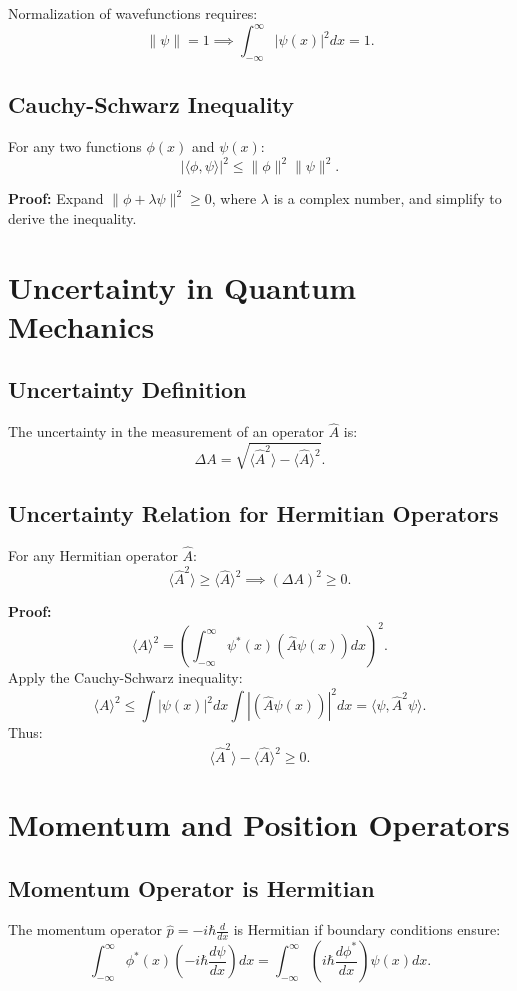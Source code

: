 \documentclass[a4paper,12pt]{article}
\begin{document}
\begin{multicols}{2}
Normalization of wavefunctions requires:
\[
\|\psi\| = 1 \implies \int_{-\infty}^\infty |\psi(x)|^2 dx = 1.
\]

\subsection*{Cauchy-Schwarz Inequality}
For any two functions $\phi(x)$ and $\psi(x)$:
\[
|\langle \phi, \psi \rangle|^2 \leq \|\phi\|^2 \|\psi\|^2.
\]

\textbf{Proof:}
Expand $\|\phi + \lambda \psi\|^2 \geq 0$, where $\lambda$ is a complex number, and simplify to derive the inequality.

\section*{Uncertainty in Quantum Mechanics}

\subsection*{Uncertainty Definition}
The uncertainty in the measurement of an operator $\hat{A}$ is:
\[
\Delta A = \sqrt{\langle \hat{A}^2 \rangle - \langle \hat{A} \rangle^2}.
\]

\subsection*{Uncertainty Relation for Hermitian Operators}
For any Hermitian operator $\hat{A}$:
\[
\langle \hat{A}^2 \rangle \geq \langle \hat{A} \rangle^2 \implies (\Delta A)^2 \geq 0.
\]

\textbf{Proof:}
\[
\langle A \rangle^2 = \left( \int_{-\infty}^\infty \psi^*(x) (\hat{A} \psi(x)) dx \right)^2.
\]
Apply the Cauchy-Schwarz inequality:
\[
\langle A \rangle^2 \leq \int |\psi(x)|^2 dx \int |(\hat{A} \psi(x))|^2 dx = \langle \psi, \hat{A}^2 \psi \rangle.
\]
Thus:
\[
\langle \hat{A}^2 \rangle - \langle \hat{A} \rangle^2 \geq 0.
\]

\section*{Momentum and Position Operators}

\subsection*{Momentum Operator is Hermitian}
The momentum operator $\hat{p} = -i\hbar \frac{d}{dx}$ is Hermitian if boundary conditions ensure:
\[
\int_{-\infty}^\infty \phi^*(x) \left(-i\hbar \frac{d\psi}{dx}\right) dx = \int_{-\infty}^\infty \left(i\hbar \frac{d\phi^*}{dx}\right) \psi(x) dx.
\]


\end{multicols}
\end{document}
